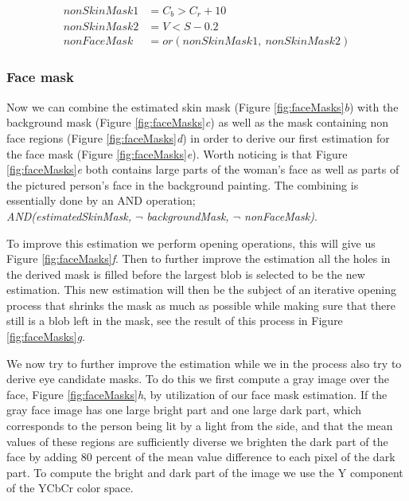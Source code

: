 \begin{equation} \label{eq:nonFaceMask}
\begin{split}
  nonSkinMask1 & = C_{b} > C_{r} + 10 \\
  nonSkinMask2 & = V < S - 0.2 \\
  nonFaceMask & = or(nonSkinMask1, \ nonSkinMask2)
\end{split}
\end{equation}

\subsubsection{Face mask}
Now we can combine the estimated skin mask (Figure \ref{fig:faceMasks}\textit{b}) with the background mask (Figure \ref{fig:faceMasks}\textit{c}) as well as the mask containing non face regions (Figure \ref{fig:faceMasks}\textit{d}) in order to derive our first estimation for the face mask (Figure \ref{fig:faceMasks}\textit{e}). Worth noticing is that Figure \ref{fig:faceMasks}\textit{e} both contains large parts of the woman's face as well as parts of the pictured person's face in the background painting. The combining is essentially done by an AND operation; \\ 
\-\hspace{1.0cm} \textit{AND(estimatedSkinMask, $\neg$ backgroundMask, $\neg$ nonFaceMask)}.

To improve this estimation we perform opening operations, this will give us Figure \ref{fig:faceMasks}\textit{f}. Then to further improve the estimation all the holes in the derived mask is filled before the largest blob is selected to be the new estimation. This new estimation will then be the subject of an iterative opening process that shrinks the mask as much as possible while making sure that there still is a blob left in the mask, see the result of this process in Figure \ref{fig:faceMasks}\textit{g}.

We now try to further improve the estimation while we in the process also try to derive eye candidate masks. To do this we first compute a gray image over the face, Figure \ref{fig:faceMasks}\textit{h}, by utilization of our face mask estimation. If the gray face image has one large bright part and one large dark part, which corresponds to the person being lit by a light from the side, and that the mean values of these regions are sufficiently diverse we brighten the dark part of the face by adding $80$ percent of the mean value difference to each pixel of the dark part. To compute the bright and dark part of the image we use the Y component of the YCbCr color space. 

